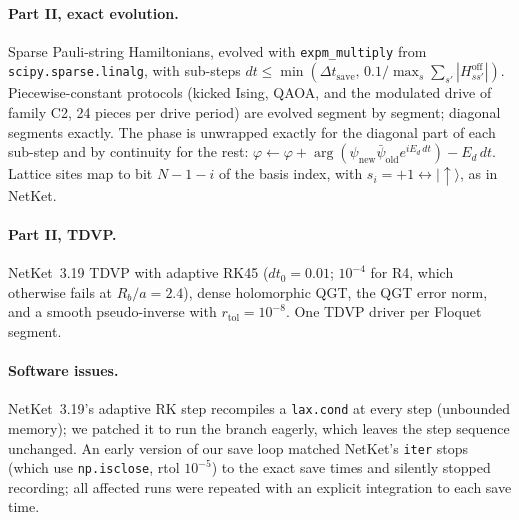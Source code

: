 \documentclass[11pt,a4paper]{article}
\begin{document}
\paragraph{Part II, exact evolution.} Sparse Pauli-string Hamiltonians, evolved with \texttt{expm\_multiply} from
\texttt{scipy.sparse.linalg}, with sub-steps $dt\le\min(\Delta t_{\mathrm{save}},\,0.1/\max_s\sum_{s'}|H^{\mathrm{off}}_{ss'}|)$.
Piecewise-constant protocols (kicked Ising, QAOA, and the modulated drive of family C2, 24 pieces per drive period) are
evolved segment by segment; diagonal segments exactly. The phase is unwrapped exactly for the diagonal part of each
sub-step and by continuity for the rest: $\varphi\leftarrow\varphi+\arg(\psi_{\mathrm{new}}\bar\psi_{\mathrm{old}}e^{iE_d\,dt})-E_d\,dt$.
Lattice sites map to bit $N-1-i$ of the basis index, with $s_i=+1\leftrightarrow|{\uparrow}\rangle$, as in NetKet.

\paragraph{Part II, TDVP.} NetKet~3.19 TDVP with adaptive RK45 ($dt_0=0.01$; $10^{-4}$ for R4, which otherwise fails
at $R_b/a=2.4$), dense holomorphic QGT, the QGT error norm, and a smooth pseudo-inverse with $r_{\mathrm{tol}}=10^{-8}$.
One TDVP driver per Floquet segment.

\paragraph{Software issues.} NetKet~3.19's adaptive RK step recompiles a \texttt{lax.cond} at every step (unbounded
memory); we patched it to run the branch eagerly, which leaves the step sequence unchanged. An early version of our
save loop matched NetKet's \texttt{iter} stops (which use \texttt{np.isclose}, rtol $10^{-5}$) to the exact save
times and silently stopped recording; all affected runs were repeated with an explicit integration to each save time.
\end{document}
